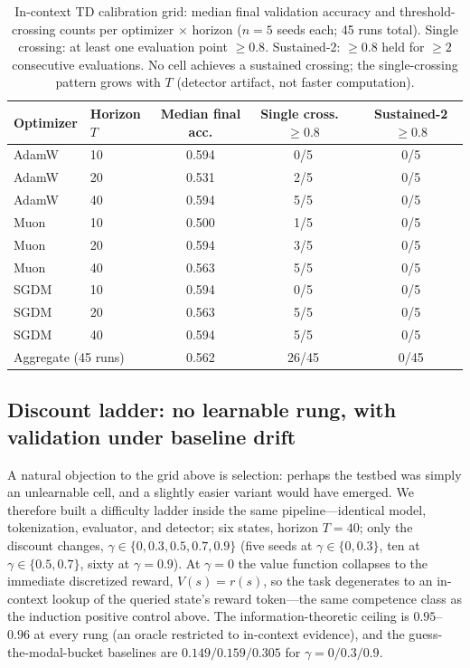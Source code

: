 \documentclass[11pt]{article}
\theoremstyle{plain}
\theoremstyle{definition}
\begin{document}
\begin{table}[htbp]
\centering
\caption{In-context TD calibration grid: median final validation accuracy and threshold-crossing counts
per optimizer $\times$ horizon ($n=5$ seeds each; 45 runs total).
Single crossing: at least one evaluation point $\geq0.8$.
Sustained-2: $\geq0.8$ held for $\geq2$ consecutive evaluations.
No cell achieves a sustained crossing; the single-crossing pattern grows with $T$ (detector artifact, not faster computation).}
\label{tab:tdgrid}
\small
\begin{tabular}{llccc}
\toprule
Optimizer & Horizon $T$ & Median final acc. & Single cross.\ $\geq0.8$ & Sustained-2 $\geq0.8$ \\
\midrule
AdamW & 10 & 0.594 & 0/5 & 0/5 \\
AdamW & 20 & 0.531 & 2/5 & 0/5 \\
AdamW & 40 & 0.594 & 5/5 & 0/5 \\
\addlinespace
Muon  & 10 & 0.500 & 1/5 & 0/5 \\
Muon  & 20 & 0.594 & 3/5 & 0/5 \\
Muon  & 40 & 0.563 & 5/5 & 0/5 \\
\addlinespace
SGDM  & 10 & 0.594 & 0/5 & 0/5 \\
SGDM  & 20 & 0.563 & 5/5 & 0/5 \\
SGDM  & 40 & 0.594 & 5/5 & 0/5 \\
\midrule
\multicolumn{2}{l}{Aggregate (45 runs)} & 0.562 & 26/45 & 0/45 \\
\bottomrule
\end{tabular}
\end{table}

\subsection{Discount ladder: no learnable rung, with validation under baseline
drift}\label{sec:ladder}

A natural objection to the grid above is selection: perhaps the testbed was simply an
unlearnable cell, and a slightly easier variant would have emerged. We therefore built a
difficulty ladder inside the same pipeline---identical model, tokenization, evaluator,
and detector; six states, horizon $T=40$; only the discount changes,
$\gamma\in\{0,0.3,0.5,0.7,0.9\}$ (five seeds at $\gamma\in\{0,0.3\}$, ten at
$\gamma\in\{0.5,0.7\}$, sixty at $\gamma=0.9$). At $\gamma=0$ the value function collapses
to the immediate discretized reward, $V(s)=r(s)$, so the task degenerates to an
in-context lookup of the queried state's reward token---the same competence class as the
induction positive control above. The information-theoretic ceiling is $0.95$--$0.96$ at
every rung (an oracle restricted to in-context evidence), and the guess-the-modal-bucket
baselines are $0.149/0.159/0.305$ for $\gamma=0/0.3/0.9$.
\end{document}
